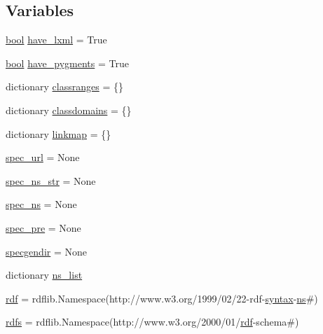 \subsection*{Variables}
\begin{DoxyCompactItemize}
\item 
\hyperlink{mac_2config_2i386_2lib-src_2libsoxr_2soxr-config_8h_abb452686968e48b67397da5f97445f5b}{bool} \hyperlink{namespacelv2specgen_a5f186d4600535a3109fe6977f26df75a}{have\+\_\+lxml} = True
\item 
\hyperlink{mac_2config_2i386_2lib-src_2libsoxr_2soxr-config_8h_abb452686968e48b67397da5f97445f5b}{bool} \hyperlink{namespacelv2specgen_a24e036b9e06280d1ebb5c8f358c535b0}{have\+\_\+pygments} = True
\item 
dictionary \hyperlink{namespacelv2specgen_a14a02895b5a9f168be8f2bcbfc786691}{classranges} = \{\}
\item 
dictionary \hyperlink{namespacelv2specgen_a2f81c0f02309f314c1d089f3d0d9b483}{classdomains} = \{\}
\item 
dictionary \hyperlink{namespacelv2specgen_a01f03a9d65450e10e7543a0f30e52664}{linkmap} = \{\}
\item 
\hyperlink{namespacelv2specgen_a838306d5c00dc2ac98ccda45181f6e2a}{spec\+\_\+url} = None
\item 
\hyperlink{namespacelv2specgen_ad4f6c4129ec0c7ad9e6998a85b105947}{spec\+\_\+ns\+\_\+str} = None
\item 
\hyperlink{namespacelv2specgen_a5846fdd64c9c66ada558d3c4d59615e5}{spec\+\_\+ns} = None
\item 
\hyperlink{namespacelv2specgen_ac7c2ed8bc47f19f1d9f9fa3c86fcc4b2}{spec\+\_\+pre} = None
\item 
\hyperlink{namespacelv2specgen_afdc97650f3f4e8e3fda54aba8367abc6}{specgendir} = None
\item 
dictionary \hyperlink{namespacelv2specgen_a6e064b1968cdd224af353a9d519ab26f}{ns\+\_\+list}
\item 
\hyperlink{namespacelv2specgen_a81517e35ec2b1d55913afce433295382}{rdf} = rdflib.\+Namespace(\textquotesingle{}http\+://www.\+w3.\+org/1999/02/22-\/rdf-\/\hyperlink{cmdline_8c_a9aea52a77da0039230114dcf40c98aa6}{syntax}-\/\hyperlink{xmltok_8c_ab6aec1346fb6c7b2733f0f73c9536ad2}{ns}\#\textquotesingle{})
\item 
\hyperlink{namespacelv2specgen_a6b4ab5b19d75b926da9675d42b04edb8}{rdfs} = rdflib.\+Namespace(\textquotesingle{}http\+://www.\+w3.\+org/2000/01/\hyperlink{namespacelv2specgen_a81517e35ec2b1d55913afce433295382}{rdf}-\/schema\#\textquotesingle{})

\end{DoxyCompactItemize}
